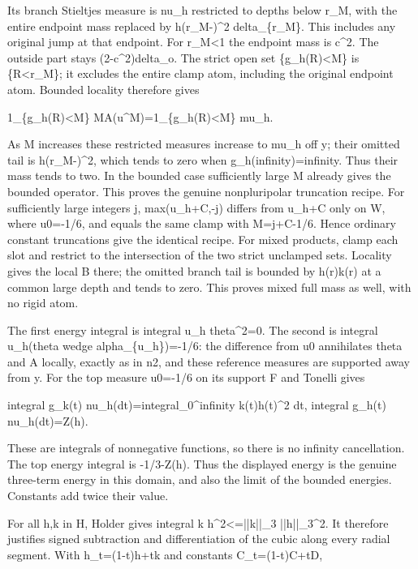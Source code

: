 \documentclass[11pt]{article}
\begin{document}
Its branch Stieltjes measure is nu\_h restricted to depths below r\_M, with the entire endpoint mass replaced by h(r\_M-)\textasciicircum{}2 delta\_\{r\_M\}. This includes any original jump at that endpoint. For r\_M<1 the endpoint mass is c\textasciicircum{}2. The outside part stays (2-c\textasciicircum{}2)delta\_o. The strict open set \{g\_h(R)<M\} is \{R<r\_M\}; it excludes the entire clamp atom, including the original endpoint atom. Bounded locality therefore gives

1\_\{g\_h(R)<M\} MA(u\textasciicircum{}M)=1\_\{g\_h(R)<M\} mu\_h.

As M increases these restricted measures increase to mu\_h off y; their omitted tail is h(r\_M-)\textasciicircum{}2, which tends to zero when g\_h(infinity)=infinity. Thus their mass tends to two. In the bounded case sufficiently large M already gives the bounded operator. This proves the genuine nonpluripolar truncation recipe. For sufficiently large integers j, max(u\_h+C,-j) differs from u\_h+C only on W, where u0=-1/6, and equals the same clamp with M=j+C-1/6. Hence ordinary constant truncations give the identical recipe. For mixed products, clamp each slot and restrict to the intersection of the two strict unclamped sets. Locality gives the local B there; the omitted branch tail is bounded by h(r)k(r) at a common large depth and tends to zero. This proves mixed full mass as well, with no rigid atom.

The first energy integral is integral u\_h theta\textasciicircum{}2=0. The second is integral u\_h(theta wedge alpha\_\{u\_h\})=-1/6: the difference from u0 annihilates theta and A locally, exactly as in n2, and these reference measures are supported away from y. For the top measure u0=-1/6 on its support F and Tonelli gives

integral g\_k(t) nu\_h(dt)=integral\_0\textasciicircum{}infinity k(t)h(t)\textasciicircum{}2 dt,
integral g\_h(t) nu\_h(dt)=Z(h).

These are integrals of nonnegative functions, so there is no infinity cancellation. The top energy integral is -1/3-Z(h). Thus the displayed energy is the genuine three-term energy in this domain, and also the limit of the bounded energies. Constants add twice their value.

For all h,k in H, Holder gives integral k h\textasciicircum{}2<=||k||\_3 ||h||\_3\textasciicircum{}2. It therefore justifies signed subtraction and differentiation of the cubic along every radial segment. With h\_t=(1-t)h+tk and constants C\_t=(1-t)C+tD,
\end{document}
